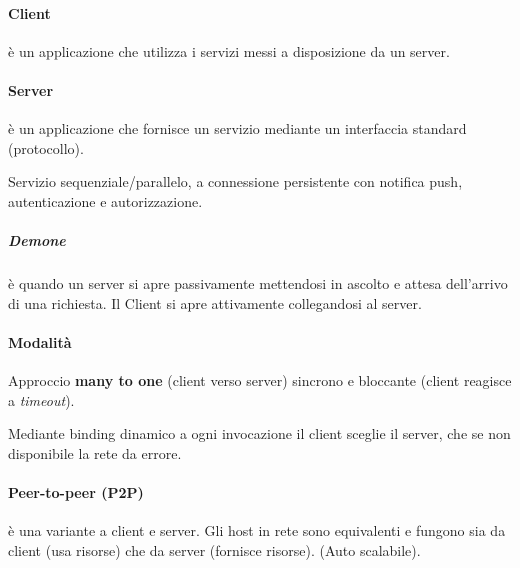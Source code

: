 \paragraph{Client} è un applicazione che utilizza i servizi messi a disposizione da un server.
\paragraph{Server} è un applicazione che fornisce un servizio mediante un interfaccia standard (protocollo).

Servizio sequenziale/parallelo, a connessione persistente con notifica push, autenticazione e autorizzazione.
\subparagraph{Demone} è quando un server si apre passivamente mettendosi in ascolto e attesa dell'arrivo di una richiesta.
Il Client si apre attivamente collegandosi al server.
\paragraph{Modalità}
Approccio \textbf{many to one} (client verso server) sincrono e bloccante (client reagisce a \textit{timeout}).

Mediante binding dinamico a ogni invocazione il client sceglie il server, che se non disponibile la rete da errore.

\paragraph{Peer-to-peer (P2P)} è una variante a client e server. Gli host in rete sono equivalenti e fungono sia da client (usa risorse) che da server (fornisce risorse). (Auto scalabile).
